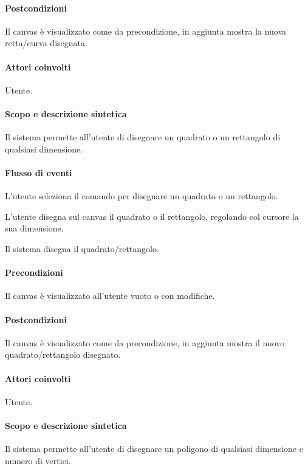 \paragraph{Postcondizioni} Il canvas \`e visualizzato come da precondizione, in aggiunta mostra la nuova retta/curva disegnata.

\paragraph{Attori coinvolti} Utente.
\paragraph{Scopo e descrizione sintetica} 
Il sistema permette all'utente di disegnare un quadrato o un rettangolo di qualsiasi dimensione.
\paragraph{Flusso di eventi}
\begin{elenconumerato}[\textbf{}]{\subsubsecindent}
\item L'utente seleziona il comando per disegnare un quadrato o un rettangolo.
\item L'utente disegna sul canvas il quadrato o il rettangolo, regolando col cursore la sua dimensione.
\item Il sistema disegna il quadrato/rettangolo.
\end{elenconumerato}
\paragraph{Precondizioni} Il canvas \`e visualizzato all'utente vuoto o con modifiche.
\paragraph{Postcondizioni} Il canvas \`e visualizzato come da precondizione, in aggiunta mostra il nuovo quadrato/rettangolo disegnato.

\paragraph{Attori coinvolti} Utente.
\paragraph{Scopo e descrizione sintetica} 
Il sistema permette all'utente di disegnare un poligono di qualsiasi dimensione e numero di vertici.
